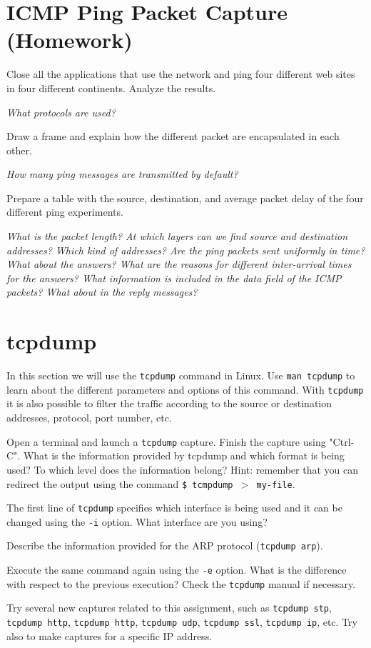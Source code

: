 \section{ICMP Ping Packet Capture (Homework)}

Close all the applications that use the network and ping four different web sites in four different continents. Analyze the results.

\emph{What protocols are used?}

Draw a frame and explain how the different packet are encapsulated in each other.

\emph{How many ping messages are transmitted by default?}

Prepare a table with the source, destination, and average packet delay  of the four different ping experiments.

\emph{What is the packet length? At which layers can we find source and destination addresses? Which kind of addresses? Are the ping packets sent uniformly in time? What about the answers? What are the reasons for different inter-arrival times for the answers? What information is included in the data field of the ICMP packets? What about in the reply messages?}

\section{tcpdump}

In this section we will use the \texttt{tcpdump} command in Linux. Use \texttt{man tcpdump} to learn about the different parameters and options of this command. With \texttt{tcpdump} it is also possible to filter the traffic according to the source or destination addresses, protocol, port number, etc.

Open a terminal and launch a \texttt{tcpdump} capture. Finish the capture using "Ctrl-C". What is the information provided by tcpdump and which format is being used? To which level does the information belong? Hint: remember that you can redirect the output using the command \texttt{\$ tcmpdump $>$ my-file}.

The first line of \texttt{tcpdump} specifies which interface is being used and it can be changed using the \texttt{-i} option. What interface are you using?

Describe the information provided for the ARP protocol (\texttt{tcpdump arp}).

Execute the same command again using the \texttt{-e} option. What is the difference with respect to the previous execution? Check the \texttt{tcpdump} manual if necessary.

Try several new captures related to this assignment, such as \texttt{tcpdump stp}, \texttt{tcpdump http}, \texttt{tcpdump http}, \texttt{tcpdump udp}, \texttt{tcpdump ssl}, \texttt{tcpdump ip}, etc. Try also to make captures for a specific IP address.
